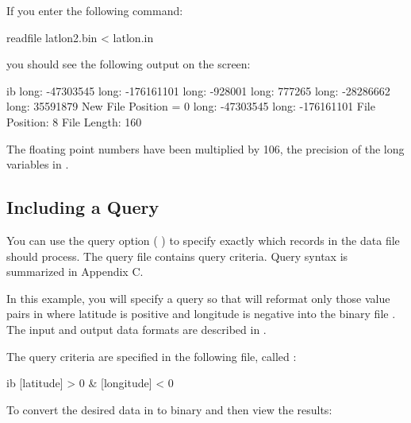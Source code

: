 If you enter the following command: 

\begin{example}
readfile latlon2.bin < latlon.in 
\end{example}

you should see the following output on the screen: 

\begin{vcode}{ib}
long:  -47303545
long: -176161101
long:    -928001
long:     777265
long:  -28286662
long:   35591879
New File Position = 0
long:  -47303545
long: -176161101
File Position: 8       File Length: 160
\end{vcode}

The floating point numbers have been multiplied by 106, the precision
of the long variables in .

\subsection{Including a Query}

You can use the query option ( ) to specify
exactly which records in the data file  should process.
The query file contains query criteria. Query syntax is summarized in
Appendix C.

In this example, you will specify a query so that  will
reformat only those value pairs in  where latitude is
positive and longitude is negative into the binary file
. The input and output data formats are described in
.

The query criteria are specified in the following file, called
:

\begin{vcode}{ib}
[latitude] > 0 & [longitude] < 0 
\end{vcode}

To convert the desired data in  to binary and then
view the results:


